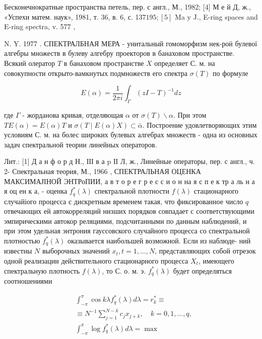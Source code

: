 \documentclass[10pt]{article}
\begin{document}
Бесконечнократные пространства петель, пер. с англ., М., 1982; [4] М е й Д, ж., «Успехи матем. наук», 1981, т. 36, в. 6, с. 137$195 ;[5]$ Ma y J., E-ring spaces and E-ring spectra, v. 577 ,

N. Y. 1977 . СПЕКТРАЛБНАЯ МЕРА - унитальный гомоморфизм нек-роӥ булевої алгебры множеств в булеву алгебру проекторов в банаховом пространстве. Всякий олератор $T$ в банаховом пространстве $X$ определяет С. м. на совокупности открыто-вамкнутых подмножеств его спектра $\sigma(T)$ по формуле



\[

E(\alpha)=\frac{1}{2 \pi i} \int_{\Gamma}(z I-T)^{-1} d z

\]



где $\Gamma$ - жорданова кривая, отделяющая $\alpha$ от $\sigma(T) \backslash \alpha$. При этом $T E(\alpha)=E(\alpha) T$ и $\sigma(T \mid E(\alpha) X) \subset \bar{\alpha}$. Построение удовлетворяющих этим условиям С. м. на болес широких булевых алгебрах множеств - одна из основных задач спектральной теории линейных операторов.



Лит.: [1] Д а н ф о р д Н., ІІІ в а $\mathrm{p}$ ІІ Л, ж., Линейные операторы, пер. с англ., ч. 2- Спектральная теория, М., 1966 , СПЕКТРАЛЬНАЯ ОЦЕНКА МАКСИМАЈІНОЙ ЭНТРоПИИ, а в т о р е г р е с с и о н на я с п е к тр а ль н а я оц ен к а, - оценка $f_{q}^{*}(\lambda)$ спектральной плотности $f(\lambda)$ стационарного случайіого процесса с дискретным временем такая, что фиксированное число $q$ отвечающих ей автокорреляций низших порядков совпадает с соответствующими эмпирическими автокор реляциями, подсчитанными по данным наблюдений, и при этом удельная энтрония гауссовского случайного процесса со спектральной плотностью $f_{q}^{*}(\lambda)$ оказывается наибольшей возможной. Если из наблюде- ний известны $N$ выборочных значений $x_{t}, t=1, \ldots, N$, представляющих собой отрезок одной реализации действительного стационарного процесса $X_{t}$, имеющего спектральную плотность $f(\lambda)$, то С. о. м. э. $f_{q}^{*}(\lambda)$ будет определяться соотношениями



\[

\begin{aligned}

& \int_{-\pi}^{\pi} \cos k \lambda f_{q}^{*}(\lambda) d \lambda=r_{k}^{*} \equiv \\

& \equiv N^{-1} \sum_{j=1}^{N-k} c_{j} x_{j+k}, \quad k=0,1, \ldots, q, \\

& \int_{-\pi}^{\pi} \log f_{q}^{*}(\lambda) d \lambda=\max

\end{aligned}

\]
\end{document}
